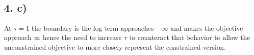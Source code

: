 \documentclass[11pt]{article}
\begin{document}
    \begin{center}
    \end{center}
    { \hspace*{\fill} \\}
    
    \hypertarget{c}{%
\subsection{4. c)}\label{c}}

At \(\tau=1\) the boundary is the log term approaches \(-\infty\) and
makes the objective approach \(\infty\) hence the need to increase
\(\tau\) to counteract that behavior to allow the unconstrained
objective to more closely represent the constrained version.
\end{document}
